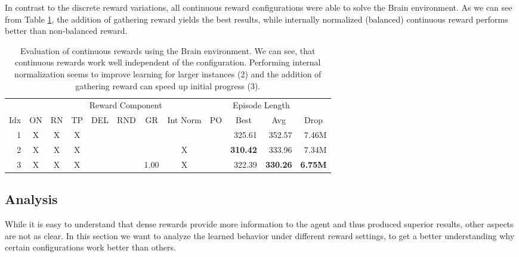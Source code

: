 In contrast to the discrete reward variations, all continuous reward configurations were able to solve the Brain environment. As we can see from Table \ref{tab:Maze0122/Reward/Continuous}, the addition of gathering reward yields the best results, while internally normalized (balanced) continuous reward performs better than non-balanced reward.

\begin{table}[htp]
    \begin{center}
        \begin{tabular}{rccccccccrrr}
            \toprule
             & \multicolumn{8}{c}{Reward Component} & \multicolumn{2}{c}{Episode Length} & \\
            \cmidrule(lr){2-9}\cmidrule(lr){10-11}
            \multicolumn{1}{c}{Idx} & \multicolumn{1}{c}{ON} & \multicolumn{1}{c}{RN} & \multicolumn{1}{c}{TP} & \multicolumn{1}{c}{DEL} & \multicolumn{1}{c}{RND} & \multicolumn{1}{c}{GR} & \multicolumn{1}{c}{Int Norm} & \multicolumn{1}{c}{PO} & \multicolumn{1}{c}{Best} & \multicolumn{1}{c}{Avg} & \multicolumn{1}{c}{Drop}\\
            \midrule
            1 & X & X & X &  &  &  &  &  & 325.61 & 352.57 & 7.46M \\
            2 & X & X & X &  &  &  & X &  & \textbf{310.42} & 333.96 & 7.34M \\
            3 & X & X & X &  &  & 1.00 & X &  & 322.39 & \textbf{330.26} & \textbf{6.75M} \\
            \bottomrule
        \end{tabular}
    \end{center}
    \caption[Evaluation of Continuous Reward using the Brain Environment]{Evaluation of continuous rewards using the Brain environment. We can see, that continuous rewards work well independent of the configuration. Performing internal normalization seems to improve learning for larger instances (2) and the addition of gathering reward can speed up initial progress (3).} \label{tab:Maze0122/Reward/Continuous}
\end{table}


\subsection{Analysis} \label{sec:RewardAnalysis}
While it is easy to understand that dense rewards provide more information to the agent and thus produced superior results, other aspects are not as clear. In this section we want to analyze the learned behavior under different reward settings, to get a better understanding why certain configurations work better than others.

